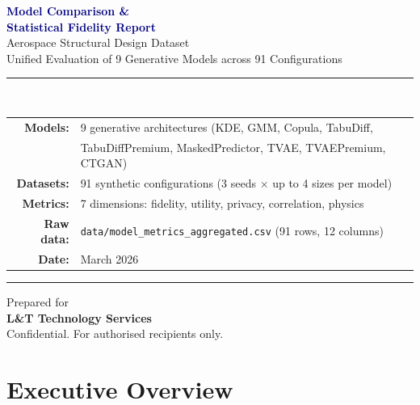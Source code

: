 \documentclass[11pt, a4paper]{report}
\begin{document}
\begin{titlepage}
\begin{center}
\vspace*{2cm}
{\Huge\bfseries\textcolor{navy}{Model Comparison \&}}\\[0.4cm]
{\Huge\bfseries\textcolor{navy}{Statistical Fidelity Report}}\\[0.9cm]
{\Large\textcolor{slate}{Aerospace Structural Design Dataset}}\\[0.3cm]
{\large\textcolor{slate}{Unified Evaluation of 9 Generative Models across 91 Configurations}}
\vspace{1.5cm}
\rule{0.65\textwidth}{1.5pt}\\[0.5cm]
{\large
\begin{tabular}{rl}
\textbf{Models:}        & 9 generative architectures (KDE, GMM, Copula, TabuDiff, \\
                        & TabuDiffPremium, MaskedPredictor, TVAE, TVAEPremium, CTGAN) \\[4pt]
\textbf{Datasets:}      & 91 synthetic configurations (3 seeds $\times$ up to 4 sizes per model) \\[4pt]
\textbf{Metrics:}       & 7 dimensions: fidelity, utility, privacy, correlation, physics \\[4pt]
\textbf{Raw data:}      & \texttt{data/model\_metrics\_aggregated.csv} (91 rows, 12 columns) \\[4pt]
\textbf{Date:}          & March 2026 \\
\end{tabular}}
\vspace{1.5cm}
\rule{0.65\textwidth}{1.5pt}
\vspace{2cm}
{\large Prepared for}\\[0.3cm]
{\Large\bfseries L\&T Technology Services}\\[1cm]
{\footnotesize\textcolor{slate}{Confidential. For authorised recipients only.}}
\end{center}
\end{titlepage}

\tableofcontents
\newpage

\chapter{Executive Overview}
\end{document}
